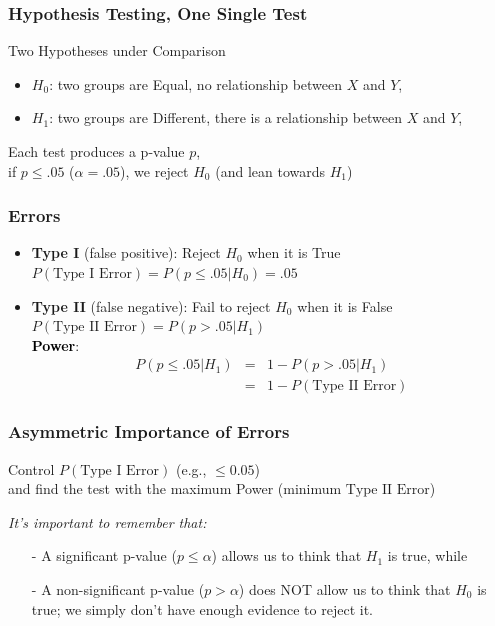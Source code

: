 \documentclass[xcolor={pdftex,dvipsnames,table}]{beamer}
\newcommand{\bbf}[1]{\textcolor{black}{\bf #1}}
\newcommand{\rbf}[1]{\textcolor{redUnipd}{ #1}}
\begin{document}
\begin{frame}
\frametitle{Hypothesis Testing, One Single Test}

\rbf{Two Hypotheses under Comparison}

\begin{itemize}
\item $H_0$: two groups are Equal, no relationship between $X$ and $Y$, 
\item $H_1$: two groups are Different, there is a relationship between $X$ and $Y$,
\end{itemize}
Each test produces a p-value $p$, \\  if $p\leq .05$ ($\alpha=.05$), we reject $H_0$ (and lean towards $H_1$)
\end{frame}

\begin{frame}
\frametitle{Errors}

\begin{itemize}
\item \textbf{Type I} (false positive): Reject $H_0$ when it is True \\
$P(\text{Type I Error})=P(p\leq .05 | H_0)=.05$
\item \textbf{Type II} (false negative): Fail to reject $H_0$ when it is False \\
$P(\text{Type II Error})=P(p> .05 | H_1)$\\
\bbf{Power}: 
\begin{eqnarray}\nonumber P(p\leq .05 | H_1)&=& 1-P(p>.05 | H_1)\\ \nonumber &=& 1-P(\text{Type II Error}) 
\end{eqnarray}
\end{itemize}
\end{frame}

\begin{frame}
\frametitle{Asymmetric Importance of Errors}

Control $P(\text{Type I Error})$ (e.g., $\leq 0.05$) \\
and find the test with the maximum Power (minimum $\text{Type II Error}$)
\bigskip

\textit{It's important to remember that:}
\begin{itemize}
\item[-] A significant p-value ($p\leq\alpha$) allows us to think that $H_1$ is true, while
\item[-] A non-significant p-value ($p>\alpha$) does NOT allow us to think that $H_0$ is true; we simply don't have enough evidence to reject it.
\end{itemize}
\end{frame}
\end{document}
